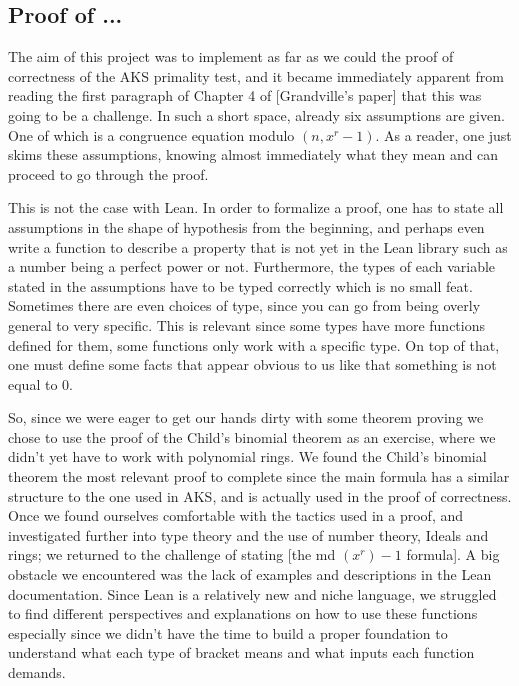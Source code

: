 \documentclass[../main.tex]{subfiles}
\begin{document}


\subsection{Proof of ...}



The aim of this project was to implement as far as we could the proof of correctness of the AKS primality test, and it became immediately apparent from reading the first paragraph of Chapter 4 of [Grandville's paper] \cite{AGranville_2004} that this was going to be a challenge. In such a short space, already six assumptions are given. One of which is a congruence equation modulo $(n, x^r-1)$. As a reader, one just skims these assumptions, knowing almost immediately what they mean and can proceed to go through the proof. 

This is not the case with Lean. In order to formalize a proof, one has to state all assumptions in the shape of hypothesis from the beginning, and perhaps even write a function to describe a property that is not yet in the Lean library such as a number being a perfect power or not. Furthermore, the types of each variable stated in the assumptions have to be typed correctly which is no small feat. Sometimes there are even choices of type, since you can go from being overly general to very specific. This is relevant since some types have more functions defined for them, some functions only work with a specific type. On top of that, one must define some facts that appear obvious to us like that something is not equal to 0.


So, since we were eager to get our hands dirty with some theorem proving we chose to use the proof of the Child's binomial theorem as an exercise, where we didn't yet have to work with polynomial rings. We found the Child's binomial theorem the most relevant proof to complete since the main formula has a similar structure to the one used in AKS, and is actually used in the proof of correctness. Once we found ourselves comfortable with the tactics used in a proof, and investigated further into type theory and the use of number theory, Ideals and rings; we returned to the challenge of stating [the md $(x^r)-1$ formula]. 
A big obstacle we encountered was the lack of examples and descriptions in the Lean documentation. Since Lean is a relatively new and niche language, we struggled to find different perspectives and explanations on how to use these functions especially since we didn't have the time to build a proper foundation to understand what each type of bracket means and what inputs each function demands. 
\end{document}
